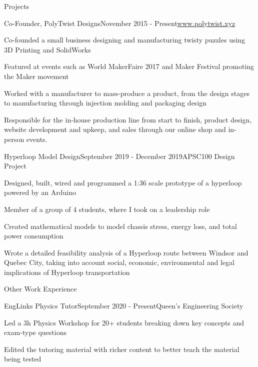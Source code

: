 \documentclass{resume} %
\begin{document}
\begin{rSection}{Projects}

\begin{rSubsection}{Co-Founder, PolyTwist Designs}{November 2015 - Present}{\url{www.polytwist.xyz}}{}
\item Co-founded a small business designing and manufacturing twisty puzzles using 3D Printing and SolidWorks
\item Featured at events such as World MakerFaire 2017 and Maker Festival promoting the Maker movement
\item Worked with a manufacturer to mass-produce a product, from the design stages to manufacturing through injection molding and packaging design
\item Responsible for the in-house production line from start to finish, product design, website development and upkeep, and sales through our online shop and in-person events.
\end{rSubsection}

\begin{rSubsection}{Hyperloop Model Design}{September 2019 - December 2019}{APSC100 Design Project}{}
\item Designed, built, wired and programmed a 1:36 scale prototype of a hyperloop powered by an Arduino
\item Member of a group of 4 students, where I took on a leadership role
\item Created mathematical models to model chassis stress, energy loss, and total power consumption
\item Wrote a detailed feasibility analysis of a Hyperloop route between Windsor and Quebec City, taking into account social, economic, environmental and legal implications of Hyperloop transportation
\end{rSubsection}


\end{rSection}



\begin{rSection}{Other Work Experience}
\begin{rSubsection}{EngLinks Physics Tutor}{September 2020 - Present}{Queen's Engineering Society}{}
\item Led a 3h Physics Workshop for 20+ students breaking down key concepts and exam-type questions
\item Edited the tutoring material with richer content to better teach the material being tested

\end{rSubsection}

\end{rSection}
\end{document}
